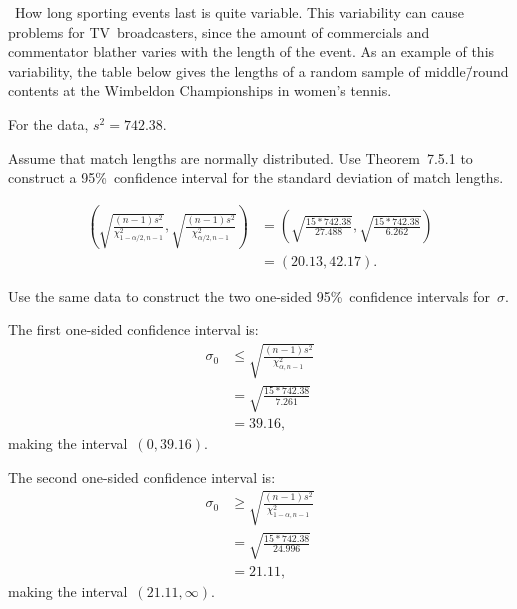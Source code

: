 \begin{problem}
  ~How long sporting events last is quite variable.  This variability can cause problems for TV~broadcasters, since the amount of commercials and commentator blather varies with the length of the event.  As an example of this variability, the table below gives the lengths of a random sample of middle\=/round contents at the Wimbeldon Championships in women's tennis.
\end{problem}

For the data, ${s^2 = 742.38}$.

\begin{subproblem}
  Assume that match lengths are normally distributed. Use Theorem~7.5.1 to construct a 95\%~confidence interval for the standard deviation of match lengths.
\end{subproblem}

\begin{align}
  \left(\sqrt{\frac{(n-1)s^2}{\chi^{2}_{1-\alpha/2,n-1}}},\sqrt{\frac{(n-1)s^2}{\chi^{2}_{\alpha/2,n-1}}}\right) &= \left(\sqrt{\frac{15 * 742.38}{27.488}}, \sqrt{\frac{15 * 742.38}{6.262}}\right) \\
                                                                                                          &= \left(20.13,42.17\right)\text{.}
\end{align}

\begin{subproblem}
  Use the same data to construct the two one-sided 95\%~confidence intervals for~$\sigma$.
\end{subproblem}

The first one-sided confidence interval is:
\begin{align}
  \sigma_0 &\leq \sqrt{\frac{(n-1)  s^2}{\chi_{\alpha,n-1}^{2}}} \\
           &= \sqrt{\frac{15 * 742.38}{7.261}} \\
           &= 39.16 \text{,}
\end{align}
\noindent
making the interval~${(0, 39.16)}$.

The second one-sided confidence interval is:
\begin{align}
  \sigma_0 &\geq \sqrt{\frac{(n-1)  s^2}{\chi_{1-\alpha,n-1}^{2}}} \\
           &= \sqrt{\frac{15 * 742.38}{24.996}} \\
           &= 21.11 \text{,}
\end{align}
\noindent
making the interval~${(21.11,\infty)}$.

